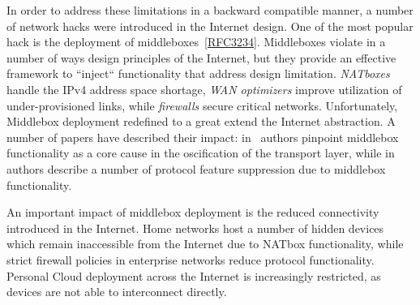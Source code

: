 In order to address these limitations in a backward compatible manner, a number
of network hacks were introduced in the Internet design. One of the most popular
hack is the deployment of middleboxes~\ref{RFC3234}.  Middleboxes violate in a
number of ways design principles of the Internet, but they provide an effective
framework to ``inject`` functionality that address design limitation.
\emph{NATboxes} handle the IPv4 address space shortage, \emph{WAN optimizers}
improve utilization of under-provisioned links, while \emph{firewalls} secure
critical networks.  Unfortunately, Middlebox deployment redefined to a great
extend the Internet abstraction. A number of papers have described their
impact: in~\cite{Honda:2011ci} authors pinpoint middlebox functionality as a
core cause in the oscification of the transport layer, while
in~\cite{Kreibich10} authors describe a number of protocol feature suppression
due to middlebox functionality. 


An important impact of middlebox deployment is the reduced connectivity
introduced in the Internet. Home networks host a number of hidden devices which
remain inaccessible from the Internet due to NATbox functionality, while strict
firewall policies in enterprise networks reduce protocol functionality.
Personal Cloud deployment across the Internet is increasingly restricted, as
devices are not able to interconnect directly.



